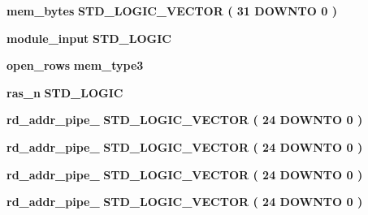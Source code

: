 \begin{DoxyCompactItemize}
\item 
{\bf mem\+\_\+bytes} {\bfseries \textcolor{comment}{S\+T\+D\+\_\+\+L\+O\+G\+I\+C\+\_\+\+V\+E\+C\+T\+OR}\textcolor{vhdlchar}{ }\textcolor{vhdlchar}{(}\textcolor{vhdlchar}{ }\textcolor{vhdlchar}{ } \textcolor{vhdldigit}{31} \textcolor{vhdlchar}{ }\textcolor{keywordflow}{D\+O\+W\+N\+TO}\textcolor{vhdlchar}{ }\textcolor{vhdlchar}{ } \textcolor{vhdldigit}{0} \textcolor{vhdlchar}{ }\textcolor{vhdlchar}{)}\textcolor{vhdlchar}{ }} 
\item 
{\bf module\+\_\+input} {\bfseries \textcolor{comment}{S\+T\+D\+\_\+\+L\+O\+G\+IC}\textcolor{vhdlchar}{ }} 
\item 
{\bf open\+\_\+rows} {\bfseries {\bfseries {\bf mem\+\_\+type3}} \textcolor{vhdlchar}{ }} 
\item 
{\bf ras\+\_\+n} {\bfseries \textcolor{comment}{S\+T\+D\+\_\+\+L\+O\+G\+IC}\textcolor{vhdlchar}{ }} 
\item 
{\bf rd\+\_\+addr\+\_\+pipe\+\_} {\bfseries \textcolor{comment}{S\+T\+D\+\_\+\+L\+O\+G\+I\+C\+\_\+\+V\+E\+C\+T\+OR}\textcolor{vhdlchar}{ }\textcolor{vhdlchar}{(}\textcolor{vhdlchar}{ }\textcolor{vhdlchar}{ } \textcolor{vhdldigit}{24} \textcolor{vhdlchar}{ }\textcolor{keywordflow}{D\+O\+W\+N\+TO}\textcolor{vhdlchar}{ }\textcolor{vhdlchar}{ } \textcolor{vhdldigit}{0} \textcolor{vhdlchar}{ }\textcolor{vhdlchar}{)}\textcolor{vhdlchar}{ }} 
\item 
{\bf rd\+\_\+addr\+\_\+pipe\+\_} {\bfseries \textcolor{comment}{S\+T\+D\+\_\+\+L\+O\+G\+I\+C\+\_\+\+V\+E\+C\+T\+OR}\textcolor{vhdlchar}{ }\textcolor{vhdlchar}{(}\textcolor{vhdlchar}{ }\textcolor{vhdlchar}{ } \textcolor{vhdldigit}{24} \textcolor{vhdlchar}{ }\textcolor{keywordflow}{D\+O\+W\+N\+TO}\textcolor{vhdlchar}{ }\textcolor{vhdlchar}{ } \textcolor{vhdldigit}{0} \textcolor{vhdlchar}{ }\textcolor{vhdlchar}{)}\textcolor{vhdlchar}{ }} 
\item 
{\bf rd\+\_\+addr\+\_\+pipe\+\_} {\bfseries \textcolor{comment}{S\+T\+D\+\_\+\+L\+O\+G\+I\+C\+\_\+\+V\+E\+C\+T\+OR}\textcolor{vhdlchar}{ }\textcolor{vhdlchar}{(}\textcolor{vhdlchar}{ }\textcolor{vhdlchar}{ } \textcolor{vhdldigit}{24} \textcolor{vhdlchar}{ }\textcolor{keywordflow}{D\+O\+W\+N\+TO}\textcolor{vhdlchar}{ }\textcolor{vhdlchar}{ } \textcolor{vhdldigit}{0} \textcolor{vhdlchar}{ }\textcolor{vhdlchar}{)}\textcolor{vhdlchar}{ }} 
\item 
{\bf rd\+\_\+addr\+\_\+pipe\+\_} {\bfseries \textcolor{comment}{S\+T\+D\+\_\+\+L\+O\+G\+I\+C\+\_\+\+V\+E\+C\+T\+OR}\textcolor{vhdlchar}{ }\textcolor{vhdlchar}{(}\textcolor{vhdlchar}{ }\textcolor{vhdlchar}{ } \textcolor{vhdldigit}{24} \textcolor{vhdlchar}{ }\textcolor{keywordflow}{D\+O\+W\+N\+TO}\textcolor{vhdlchar}{ }\textcolor{vhdlchar}{ } \textcolor{vhdldigit}{0} \textcolor{vhdlchar}{ }\textcolor{vhdlchar}{)}\textcolor{vhdlchar}{ }} 

\end{DoxyCompactItemize}

